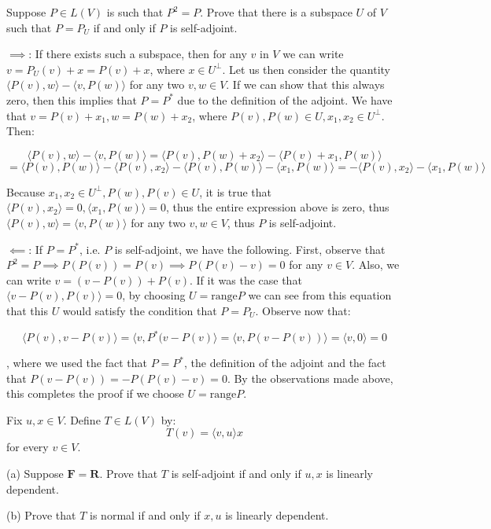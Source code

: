 \begin{exercise}{11}
    Suppose $P \in L(V)$ is such that $P^2 = P$. Prove that there is a subspace $U$ of $V$ such that $P = P_U$ if and only if $P$ is self-adjoint.
\end{exercise}

\begin{solution}
    $\implies$: If there exists such a subspace, then for any $v$ in $V$ we can write $v = P_U(v) + x = P(v) + x$, where $x \in U^\bot$. Let us then consider the quantity $\langle P(v), w \rangle - \langle v, P(w)\rangle$ for any two $v, w \in V$. If we can show that this always zero, then this implies that $P = P^*$ due to the definition of the adjoint. We have that $v = P(v) + x_1, w = P(w) + x_2$, where $P(v), P(w) \in U, x_1, x_2 \in U^\bot$. Then:

    $$\langle P(v), w \rangle - \langle v, P(w) \rangle = \langle P(v), P(w) + x_2 \rangle - \langle P(v) + x_1, P(w) \rangle $$
    $$= \langle P(v), P(w) \rangle - \langle P(v), x_2 \rangle - \langle P(v), P(w) \rangle - \langle x_1, P(w) \rangle = - \langle P(v), x_2\rangle - \langle x_1, P(w)\rangle$$

    Because $x_1, x_2 \in U^\bot, P(w), P(v) \in U$, it is true that $\langle P(v), x_2 \rangle = 0, \langle x_1, P(w) \rangle = 0$, thus the entire expression above is zero, thus $\langle P(v), w\rangle = \langle v, P(w) \rangle$ for any two $v, w \in V$, thus $P$ is self-adjoint.
    
    $\impliedby$: If $P = P^*$, i.e. $P$ is self-adjoint, we have the following. First, observe that $P^2 = P \implies P(P(v)) = P(v) \implies P(P(v) - v) = 0$ for any $v \in V$. Also, we can write $v = (v - P(v)) + P(v)$. If it was the case that $\langle v - P(v), P(v) \rangle = 0$, by choosing $U = \text{range} P$ we can see from this equation that this $U$ would satisfy the condition that $P = P_U$. Observe now that:

    $$\langle P(v), v - P(v) \rangle = \langle v, P^*(v - P(v) \rangle = \langle v, P(v - P(v)) \rangle = \langle v, 0 \rangle = 0$$

    , where we used the fact that $P = P^*$, the definition of the adjoint and the fact that $P(v - P(v)) = -P(P(v) - v) = 0$. By the observations made above, this completes the proof if we choose $U = \text{range} P$.
\end{solution}

\begin{exercise}{15}
    Fix $u, x \in V$. Define $T \in L(V)$ by:
    $$T(v) = \langle v, u \rangle x$$
    for every $v \in V$.

    (a) Suppose $\mathbf{F} = \mathbf{R}$. Prove that $T$ is self-adjoint if and only if $u, x$ is linearly dependent.

    (b) Prove that $T$ is normal if and only if $x, u$ is linearly dependent.
\end{exercise}

